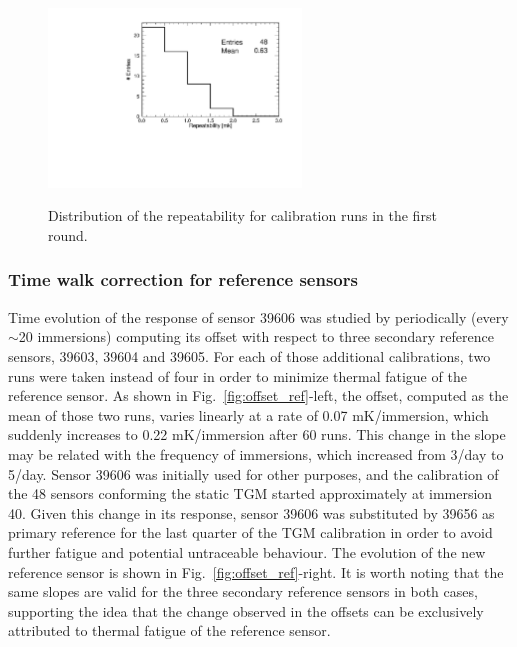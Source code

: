 \begin{figure}[htbp]
\centering
{\includegraphics[width=0.6\textwidth]{images/figure_11.pdf}}
\caption{Distribution of the repeatability for calibration runs in the first round.}
\label{fi:CAL_rms_1r}
\end{figure}

\subsubsection{Time walk correction for reference sensors}
\label{sec:reference_corrections}
\noindent Time evolution of the response of sensor 39606 was studied by periodically (every $\sim$20 immersions)  computing its offset with respect to three secondary reference sensors, 39603, 39604 and 39605. For each of those additional calibrations, two runs were taken instead of four in order to minimize thermal fatigue of the reference sensor. As shown in Fig.~\ref{fig:offset_ref}-left, the offset, computed as the mean of those two runs, varies linearly at a rate of 0.07 mK/immersion, which suddenly increases to 0.22 mK/immersion after 60 runs. This change in the slope may be related with the frequency of immersions, which increased from 3/day to 5/day. Sensor 39606 was initially used for other purposes, and the calibration of the 48 sensors conforming the static TGM started approximately at immersion 40. Given this change in its response, sensor 39606 was substituted by 39656 as primary reference for the last quarter of the TGM calibration in order to avoid further fatigue and potential untraceable behaviour. The evolution of the new reference sensor is shown in Fig.~\ref{fig:offset_ref}-right. It is worth noting that the same slopes are valid for the three secondary reference sensors in both cases, supporting the idea that the change observed in the offsets can be exclusively attributed to thermal fatigue of the reference sensor. 

